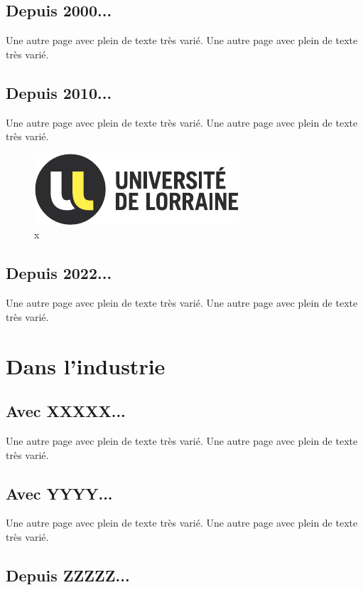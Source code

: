     \section{Depuis 2000...}
        Une autre page avec plein de texte très varié.
        Une autre page avec plein de texte très varié.

    \section{Depuis 2010...}
        Une autre page avec plein de texte très varié.
        Une autre page avec plein de texte très varié.

        \begin{figure}[htb]
            \includegraphics{tulul}
            \caption{x\label{rintintin}}
        \end{figure}

    \section{Depuis 2022...}
        Une autre page avec plein de texte très varié.
        Une autre page avec plein de texte très varié.

\chapter{Dans l'industrie}

    \section{Avec XXXXX...}
        Une autre page avec plein de texte très varié.
        Une autre page avec plein de texte très varié.

    \section{Avec YYYY...}
        Une autre page avec plein de texte très varié.
        Une autre page avec plein de texte très varié.

    \section{Depuis ZZZZZ...}

